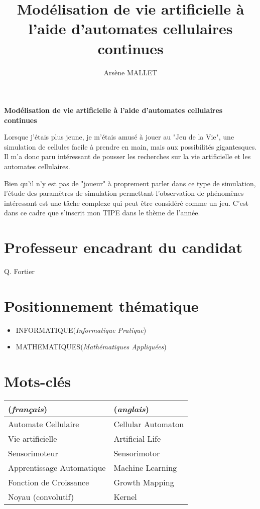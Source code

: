\documentclass[a4paper, 11pt]{article}
\author{Arsène MALLET}
\title{Modélisation de vie artificielle à l'aide d'automates cellulaires continues}
\begin{document}
    
\begin{center}
{\textbf {Modélisation de vie artificielle à l'aide d'automates cellulaires continues}}
\end{center}

Lorsque j'étais plus jeune, je m'étais amusé à jouer au "Jeu de la Vie", une simulation
de cellules facile à prendre en main, mais aux possibilités gigantesques. Il m'a donc
paru intéressant de pousser les recherches sur la vie artificielle et les automates
cellulaires.

Bien qu'il n'y est pas de "joueur" à proprement parler dans ce type de simulation, 
l'étude des paramètres de simulation permettant l'observation de phénomènes intéressant
est une tâche complexe qui peut être considéré comme un jeu. C'est dans ce cadre que 
s'inscrit mon TIPE dans le thème de l'année.

\vspace{5mm}

\section*{Professeur encadrant du candidat}
Q. Fortier

\section*{Positionnement th\'ematique}
\begin{itemize}
    \item INFORMATIQUE(\textit{Informatique Pratique})
    \item MATHEMATIQUES(\textit{Math\'ematiques Appliqu\'ees})
\end{itemize}

\section*{Mots-cl\'es}

\begin{tabular}{l l} 
    (\textit{français}) & (\textit{anglais}) \\ \hline
    Automate Cellulaire & Cellular Automaton \\
    Vie artificielle & Artificial Life \\
    Sensorimoteur & Sensorimotor \\
    Apprentissage Automatique & Machine Learning \\
    Fonction de Croissance & Growth Mapping \\
    Noyau (convolutif) & Kernel \\ \hline
    \end{tabular}
\end{document}
